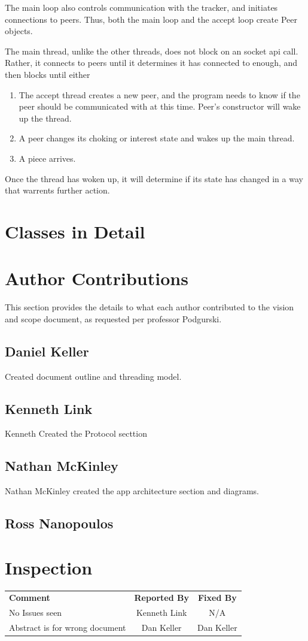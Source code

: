 \documentclass[letter]{scrartcl}
\begin{document}
The main loop also controls communication with the tracker, and initiates connections to peers. Thus, both the main loop and the accept loop create Peer objects. 

The main thread, unlike the other threads, does not block on an socket api call. Rather, it connects to peers until it determines it has connected to enough, and then blocks until either
\begin{enumerate}
\item The accept thread creates a new peer, and the program needs to know if the peer should be communicated with at this time. Peer's constructor will wake up the thread.
\item A peer changes its choking or interest state and wakes up the main thread.
\item A piece arrives.
\end{enumerate}
Once the thread has woken up, it will determine if its state has changed in a way that warrents further action.

\section{Classes in Detail}

\pagebreak
\section{Author Contributions}
This section provides the details to what each author contributed to the vision and scope document, as requested per professor Podgurski.
\subsection{Daniel Keller}
Created document outline and threading model.
\subsection{Kenneth Link}
Kenneth Created the Protocol secttion
\subsection{Nathan McKinley}
Nathan McKinley created the app architecture section and diagrams.
\subsection{Ross Nanopoulos}


\section{Inspection}
\begin{tabularx}{\textwidth}{X c c}
\textbf{Comment} & \textbf{Reported By} & \textbf{Fixed By} \\
No Issues seen& Kenneth Link& N/A \\
Abstract is for wrong document & Dan Keller & Dan Keller \\
\end{tabularx}
\end{document}
